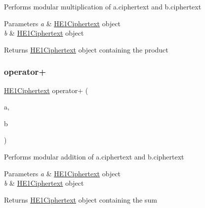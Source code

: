 Performs modular multiplication of {\ttfamily a.\+ciphertext} and {\ttfamily b.\+ciphertext} 
\begin{DoxyParams}{Parameters}
{\em a} & {\ttfamily \hyperlink{classHE1Ciphertext}{H\+E1\+Ciphertext}} object \\
\hline
{\em b} & {\ttfamily \hyperlink{classHE1Ciphertext}{H\+E1\+Ciphertext}} object \\
\hline
\end{DoxyParams}
\begin{DoxyReturn}{Returns}
{\ttfamily \hyperlink{classHE1Ciphertext}{H\+E1\+Ciphertext}} object containing the product 
\end{DoxyReturn}
\mbox{\label{classHE1Ciphertext_a2e914308f6b7d88f63067fca516f4055}} 
\subsubsection{\texorpdfstring{operator+}{operator+}}
{\footnotesize\ttfamily \hyperlink{classHE1Ciphertext}{H\+E1\+Ciphertext} operator+ (\begin{DoxyParamCaption}\item[{const \hyperlink{classHE1Ciphertext}{H\+E1\+Ciphertext} \&}]{a,  }\item[{const \hyperlink{classHE1Ciphertext}{H\+E1\+Ciphertext} \&}]{b }\end{DoxyParamCaption})\hspace{0.3cm}{\ttfamily [friend]}}

Performs modular addition of {\ttfamily a.\+ciphertext} and {\ttfamily b.\+ciphertext} 
\begin{DoxyParams}{Parameters}
{\em a} & {\ttfamily \hyperlink{classHE1Ciphertext}{H\+E1\+Ciphertext}} object \\
\hline
{\em b} & {\ttfamily \hyperlink{classHE1Ciphertext}{H\+E1\+Ciphertext}} object \\
\hline
\end{DoxyParams}
\begin{DoxyReturn}{Returns}
{\ttfamily \hyperlink{classHE1Ciphertext}{H\+E1\+Ciphertext}} object containing the sum 
\end{DoxyReturn}
\mbox{\label{classHE1Ciphertext_a684afdb22c43258ab0e2e5ab73abaed0}} 
